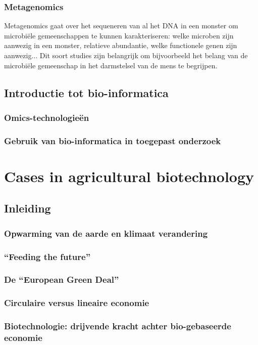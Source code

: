 \documentclass[a4paper,kul]{kulakarticle} %
\begin{document}
\subsubsection{Metagenomics}
Metagenomics gaat over het sequeneren van al het DNA in een monster om microbiële gemeenschappen te kunnen karakteriseren: welke microben zijn aanwezig in een monster, relatieve abundantie, welke functionele genen zijn aanwezig$\ldots$ Dit soort studies zijn belangrijk om bijvoorbeeld het belang van de microbiële gemeenschap in het darmstelsel van de mens te begrijpen. 
\subsection{Introductie tot bio-informatica}
\subsubsection{Omics-technologieën}
\subsubsection{Gebruik van bio-informatica in toegepast onderzoek}
\newpage
\section{Cases in agricultural biotechnology}
\subsection{Inleiding}
\subsubsection{Opwarming van de aarde en klimaat verandering}
\subsubsection{“Feeding the future”}
\subsubsection{De “European Green Deal”}
\subsubsection{Circulaire versus lineaire economie}
\subsubsection{Biotechnologie: drijvende kracht achter bio-gebaseerde economie}
\end{document}
